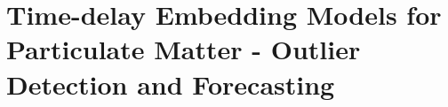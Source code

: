 \chapter{Time-delay Embedding Models for Particulate Matter - Outlier Detection and Forecasting}\label{ch:havok}
